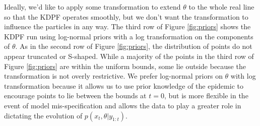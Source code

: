 \documentclass{elsarticle}
\begin{document}
Ideally, we'd like to apply some transformation to extend $\theta$ to the whole real line so that the KDPF operates smoothly, but we don't want the transformation to influence the particles in any way. The third row of Figure \ref{fig:priors} shows the KDPF run using log-normal priors with a log transformation on the components of $\theta$. As in the second row of Figure \ref{fig:priors}, the distribution of points do not appear truncated or S-shaped. While a majority of the points in the third row of Figure \ref{fig:priors} are within the uniform bounds, some lie outside because the transformation is not overly restrictive. We prefer log-normal priors on $\theta$ with log transformation because it allows us to use prior knowledge of the epidemic to encourage points to lie between the bounds at $t = 0$, but is more flexible in the event of model mis-specification and allows the data to play a greater role in dictating the evolution of $p(x_t,\theta|y_{1:t})$.
\end{document}
